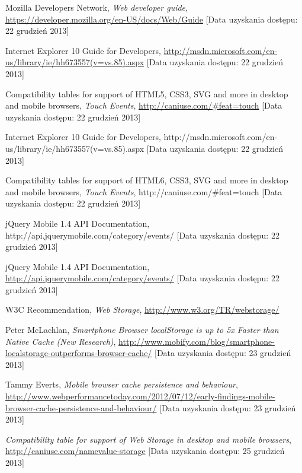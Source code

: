 \begin{thebibliography}{1}
   Mozilla Developers Network, {\em Web developer guide}, \url{https://developer.mozilla.org/en-US/docs/Web/Guide} [Data uzyskania dostępu: 22 grudzień 2013]
  
   Internet Explorer 10 Guide for Developers, \url{http://msdn.microsoft.com/en-us/library/ie/hh673557(v=vs.85).aspx} [Data uzyskania dostępu: 22 grudzień 2013]
  
   Compatibility tables for support of HTML5, CSS3, SVG and more in desktop and mobile browsers, {\em Touch Events}, \url{http://caniuse.com/\#feat=touch} [Data uzyskania dostępu: 22 grudzień 2013]
  
   Internet Explorer 10 Guide for Developers, http://msdn.microsoft.com/en-us/library/ie/hh673557(v=vs.85).aspx [Data uzyskania dostępu: 22 grudzień 2013]
  
   Compatibility tables for support of HTML6, CSS3, SVG and more in desktop and mobile browsers, {\em Touch Events}, http://caniuse.com/\#feat=touch [Data uzyskania dostępu: 22 grudzień 2013]
  
   jQuery Mobile 1.4 API Documentation, http://api.jquerymobile.com/category/events/ [Data uzyskania dostępu: 22 grudzień 2013]
  
   jQuery Mobile 1.4 API Documentation, \url{http://api.jquerymobile.com/category/events/} [Data uzyskania dostępu: 22 grudzień 2013]
  
   W3C Recommendation, {\em Web Storage}, \url{http://www.w3.org/TR/webstorage/}
  
   Peter McLachlan, \emph{Smartphone Browser localStorage is up to 5x Faster than Native Cache (New Research)}, \url{http://www.mobify.com/blog/smartphone-localstorage-outperforms-browser-cache/} [Data uzyskania dostępu: 23 grudzień 2013]

   Tammy Everts, \emph{Mobile browser cache persistence and behaviour}, \url{http://www.webperformancetoday.com/2012/07/12/early-findings-mobile-browser-cache-persistence-and-behaviour/} [Data uzyskania dostępu: 23 grudzień 2013]

   \emph{Compatibility table for support of Web Storage in desktop and mobile browsers}, \url{http://caniuse.com/namevalue-storage} [Data uzyskania dostępu: 25 grudzień 2013]
  

\end{thebibliography}
